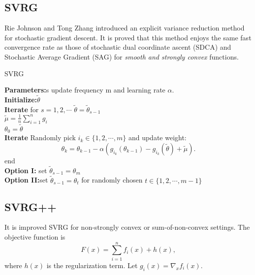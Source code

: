 \documentclass[11pt]{article} %
\begin{document}
\subsection{SVRG}%
Rie Johnson and Tong Zhang introduced an explicit variance reduction method for stochastic gradient descent.
It is proved that this method enjoys the same fast convergence rate as those of stochastic dual coordinate ascent (SDCA) and Stochastic Average Gradient (SAG) for \emph{smooth and strongly convex} functions.
%
%
%

\begin{algorithm}[htb]
\caption{SVRG}
\textbf{Parameters:}s update frequency m and learning rate $\alpha$.\\
\textbf{Initialize:}$\tilde{\theta}$\\
\textbf{Iterate} for $s = 1,2,\cdots $
    $\tilde{\theta}={\tilde{\theta}_{s-1}}$\\
    $\tilde{\mu}=\frac{1}{n}\sum_{i=1}^{n} g_i $\\
    ${\theta}_{0}=\tilde{\theta} $\\
    \textbf{Iterate} Randomly pick $i_k \in \{1,2,\cdots, m\}$ and update weight: $${\theta}_k={\theta}_{k-1}-\alpha(g_{i_k}({\theta}_{k-1})-g_{i_k}(\tilde{\theta})+\tilde{\mu}).$$
  end\\
 \textbf{Option I:} set ${\tilde{\theta}}_{s-1}={\theta}_m$\\
 \textbf{Option II:}set  ${\tilde{\theta}}_{s-1}={\theta}_t$ for randomly chosen $t\in\{1,2,\cdots,m-1\}$

\end{algorithm}
\subsection{SVRG++}
It is improved SVRG for non-strongly convex or sum-of-non-convex settings.%
The objective function is $$F(x)=\sum _{i=1}^{n}f_{i}(x)+h(x),$$where $h(x)$ is the regularization term.
Let $g_i(x)={\nabla}_{x} f_i(x)$.
\end{document}

